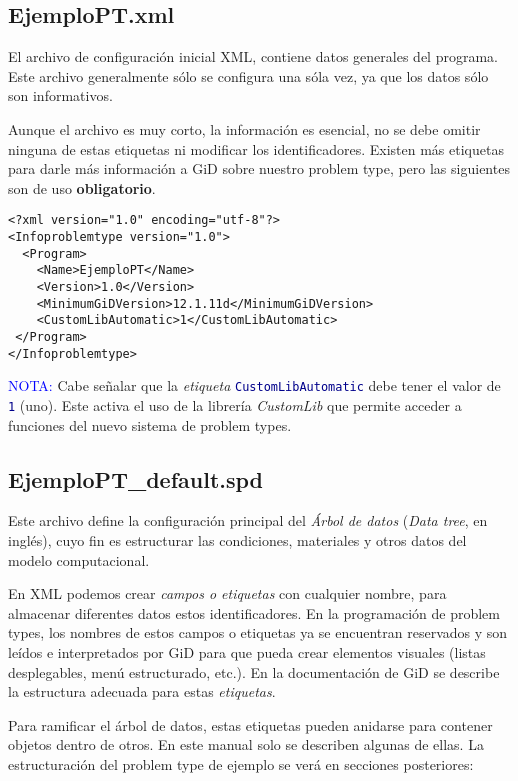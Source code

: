 \documentclass[10pt, a4paper, twocolumn]{article} %
\begin{document}
\subsection{EjemploPT.xml} \label{sec:codigoXML}

El archivo de configuración inicial XML, contiene datos generales del programa. Este archivo generalmente sólo se configura una sóla vez, ya que los datos sólo son informativos.

Aunque el archivo es muy corto, la información es esencial, no se debe omitir ninguna de estas etiquetas ni modificar los identificadores. Existen más etiquetas para darle más información a GiD sobre nuestro problem type, pero las siguientes son de uso \textbf{obligatorio}.

\lstset{language=XML} 
\begin{lstlisting}
<?xml version="1.0" encoding="utf-8"?>
<Infoproblemtype version="1.0">
  <Program>
    <Name>EjemploPT</Name>
    <Version>1.0</Version>   
    <MinimumGiDVersion>12.1.11d</MinimumGiDVersion>
    <CustomLibAutomatic>1</CustomLibAutomatic>
 </Program>
</Infoproblemtype>
\end{lstlisting}

\textcolor{blue}{NOTA:} Cabe señalar que la \textit{etiqueta} \texttt{\textcolor{darkblue}{CustomLibAutomatic}} debe tener el valor de \texttt{\textcolor{darkblue}{1}} (uno). Este activa el uso de la librería \textit{CustomLib} que permite acceder a funciones del nuevo sistema de problem types.

\subsection{EjemploPT\_default.spd}

Este archivo define la configuración principal del \textit{Árbol de datos} (\textit{Data tree}, en inglés), cuyo fin es estructurar las condiciones, materiales y otros datos del modelo computacional.

En XML podemos crear \textit{campos o etiquetas} con cualquier nombre, para almacenar diferentes datos estos identificadores. En la programación de problem types, los nombres de estos campos o etiquetas ya se encuentran reservados y son leídos e interpretados por GiD para que pueda crear elementos visuales (listas desplegables, menú estructurado, etc.). En la documentación de GiD se describe la estructura adecuada para estas \textit{etiquetas}.

Para ramificar el árbol de datos, estas etiquetas pueden anidarse para contener objetos dentro de otros. En este manual solo se describen algunas de ellas. La estructuración del problem type de ejemplo se verá en secciones posteriores:
\end{document}
